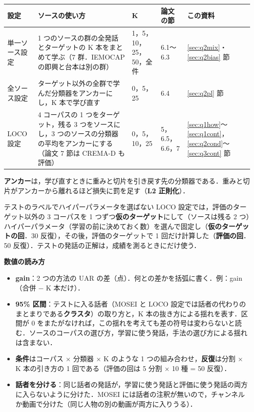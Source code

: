\documentclass[a4paper,10pt]{ltjsarticle}
\begin{document}
\vspace{-4pt}
\begin{center}
\small
\begin{tabular}{>{\raggedright}p{2.3cm}>{\raggedright}p{7.0cm}p{2.4cm}p{1.8cm}p{1.8cm}}
\toprule
設定 & ソースの使い方 & K & 論文の節 & この資料 \\
\midrule
単一ソース設定 & 1 つのソースの群の全発話とターゲットの K 本をまとめて学ぶ（7 群．IEMOCAP の即興と台本は別の群） & 1，5，10，25，50，全件 & 6.1〜6.3 & \ref{sec:q2mix}・\ref{sec:q2bias} 節 \\
全ソース設定 & ターゲット以外の全群で学んだ分類器をアンカーにし，K 本で学び直す & 0，5，25 & 6.4 & \ref{sec:q2pl} 節 \\
LOCO 設定 & 4 コーパスの 1 つをターゲット，残る 3 つをソースにし，3 つのソースの分類器の平均をアンカーにする（論文 7 節は CREMA-D も評価） & 0，5，10，25 & 5，6.5，6.6，7 & \ref{sec:q1how}〜\ref{sec:q1cont}，\ref{sec:q2cond}〜\ref{sec:q3cont} 節 \\
\bottomrule
\end{tabular}
\end{center}
\noindent\textbf{アンカー}は，学び直すときに重みと切片を引き戻す先の分類器である．重みと切片がアンカーから離れるほど損失に罰を足す（\textbf{L2 正則化}）．

\begin{waku}{テストのラベルでハイパーパラメータを選ばない}
\small LOCO 設定では，評価のターゲット以外の 3 コーパスを 1 つずつ\textbf{仮のターゲット}にして（ソースは残る 2 つ）ハイパーパラメータ（学習の前に決めておく数）を選んで固定し（\textbf{仮のターゲットの回}．30 反復），その後，評価のターゲットで 1 回だけ計算した（\textbf{評価の回}．50 反復）．テストの発話の正解は，成績を測るときにだけ使う．
\end{waku}

\noindent\textbf{数値の読み方}
\begin{itemize}
  \item \textbf{gain}：2 つの方法の UAR の差（点）．何との差かを括弧に書く．例：gain（合併 − K 本だけ）．
  \item \textbf{95\% 区間}：テストに入る話者（MOSEI と LOCO 設定では話者の代わりのまとまりである\textbf{クラスタ}）の取り方と，K 本の抜き方による揺れを表す．区間が 0 をまたがなければ，この揺れを考えても差の符号は変わらないと読む．ソースのコーパスの選び方，学習に使う発話，手法の選び方による揺れは含まない．
  \item \textbf{条件}はコーパス × 分類器 × K のような 1 つの組み合わせ，\textbf{反復}は分割 × K 本の引き方の 1 回である（評価の回は 5 分割 × 10 種 = 50 反復）．
  \item \textbf{話者を分ける}：同じ話者の発話が，学習に使う発話と評価に使う発話の両方に入らないように分けた．MOSEI には話者の注釈が無いので，チャンネルか動画で分けた（同じ人物の別の動画が両方に入りうる）．
\end{itemize}
\end{document}
